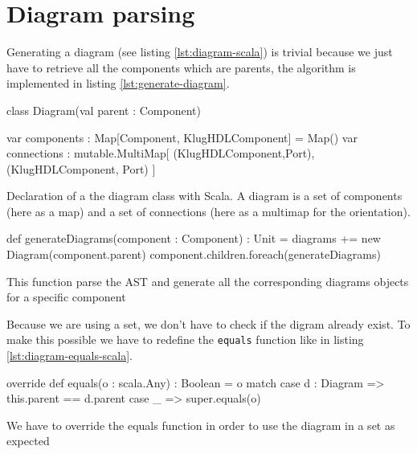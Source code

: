 \section{Diagram parsing}
\label{sec:diagrams-parsing}

Generating a diagram (see listing \ref{lst:diagram-scala}) is trivial because we
just have to retrieve all the components which are parents, the algorithm is
implemented in listing \ref{lst:generate-diagram}. 
\begin{listing}[H]
  \centering
  \begin{scalacode}
    class Diagram(val parent : Component) {

      var components : Map[Component, KlugHDLComponent] = Map()
      var connections : mutable.MultiMap[
          (KlugHDLComponent,Port),
          (KlugHDLComponent, Port)
        ]
      }
  \end{scalacode}
  \caption[Diagram class declaration]{Declaration of a the diagram class with
    Scala. A diagram is a set of components (here as a map) and a set of
    connections (here as a multimap for the orientation).}
  \label{lst:diagram-scala}
\end{listing}

\begin{listing}[H]
  \centering
  \begin{scalacode}
  def generateDiagrams(component : Component) : Unit = {
    diagrams += new Diagram(component.parent)
    component.children.foreach(generateDiagrams)
  }
  \end{scalacode}
  \caption[Parsing the diagrams form the AST]{This function parse the AST and
    generate all the corresponding diagrams objects for a specific component}
  \label{lst:generate-diagram}
\end{listing}

Because we are using a set,
we don't have to check if the digram already exist. To make this possible we
have to redefine the \verb|equals| function like in listing \ref{lst:diagram-equals-scala}.

\begin{listing}[H]
  \centering
  \begin{scalacode}
  override def equals(o : scala.Any) : Boolean = o match {
    case d : Diagram => this.parent == d.parent
    case _ => super.equals(o)
  }
  \end{scalacode}
  \caption[Equals function implementation for the Diagram Class]{We have to
    override the equals function in order to use the diagram in a set as expected}
  \label{lst:diagram-equals-scala}
\end{listing}


